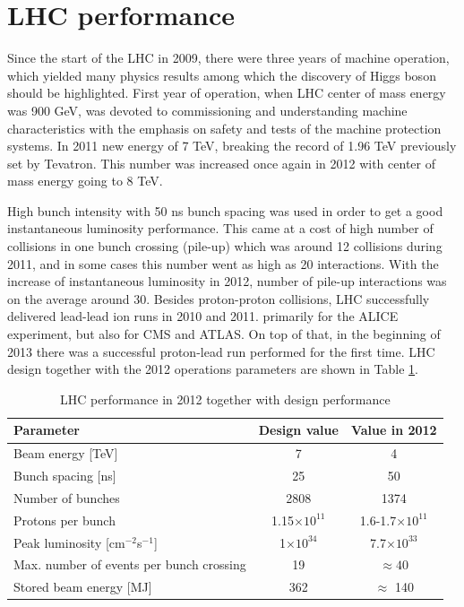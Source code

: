 
\section{LHC performance}

Since the start of the LHC in 2009, there were three years of machine operation, which yielded many physics results among which the discovery of Higgs boson should be highlighted. First year of operation, when LHC center of mass energy was 900 GeV, was devoted to commissioning and understanding machine characteristics with the emphasis on safety and tests of the machine protection systems. In 2011 new energy of 7 TeV, breaking the record of 1.96 TeV previously set by Tevatron. This number was increased once again in 2012 with center of mass energy going to 8 TeV.
\par High bunch intensity with 50 ns bunch spacing was used in order to get a good instantaneous luminosity performance. This came at a cost of high number of collisions in one bunch crossing (pile-up) which was around 12 collisions during 2011, and in some cases this number went as high as 20 interactions. With the increase of instantaneous luminosity in 2012, number of pile-up interactions was on the average around 30. Besides proton-proton collisions, LHC successfully delivered lead-lead ion runs in 2010 and 2011. primarily for the ALICE experiment, but also for CMS and ATLAS. On top of that, in the beginning of 2013 there was a successful proton-lead run performed for the first time. LHC design together with the 2012 operations parameters are shown in Table \ref{tab:LHC_design}. 

\begin{table}[h]
\centering
  \caption{LHC performance in 2012 together with design performance\cite{Evans:2008zzb}}
	\label{tab:LHC_design}
  \begin{tabular}{ l  c  c }
      \hline
      \hline
      Parameter & Design value & Value in 2012 \\
      \hline
      Beam energy [TeV] & 7 & 4 \\
      Bunch spacing [ns] & 25 & 50 \\
      Number of bunches & 2808 & 1374 \\
      Protons per bunch & 1.15$\times 10^{11}$ & 1.6-1.7$\times 10^{11}$ \\
      Peak luminosity [cm$^{-2}$s$^{-1}$] & 1$\times 10^{34}$ & 7.7$\times 10^{33}$ \\
      Max. number of events per bunch crossing & 19 & $\approx 40$ \\
      Stored beam energy [MJ] & 362 & $\approx$ 140 \\
      \hline
      \hline 
  \end{tabular}
\end{table}


